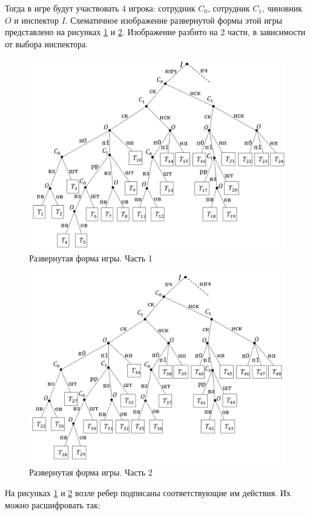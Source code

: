 Тогда в игре будут участвовать 4 игрока: сотрудник $C_0$, сотрудник $C_1$, чиновник $O$ и инспектор $I$. Схематичное изображение развернутой формы этой игры представлено на рисунках \ref{fig:figef21} и \ref{fig:figef22}. Изображение разбито на 2 части, в зависимости от выбора инспектора.
\begin{figure}[H]
	\centering
	\includegraphics[width=0.9\linewidth]{inc/img/ef21}
	\caption{Развернутая форма игры. Часть 1}
	\label{fig:figef21}
\end{figure}
\begin{figure}[H]
	\centering
	\includegraphics[width=0.9\linewidth]{inc/img/ef22}
	\caption{Развернутая форма игры. Часть 2}
	\label{fig:figef22}
\end{figure}
\par
На рисунках \ref{fig:figef21} и \ref{fig:figef22} возле ребер подписаны соответствующие им действия. Их можно расшифровать так:
